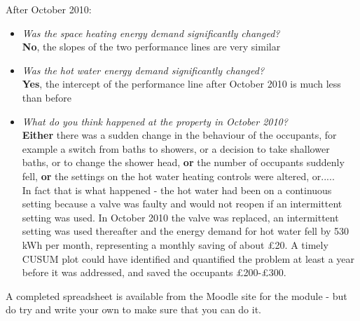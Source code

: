 \documentclass{article}
\begin{document}
\begin{enumerate}
After October 2010:
{\color{OliveGreen}
\begin{itemize}
\item \textit{Was the space heating energy demand significantly changed?} \\\textbf{No}, the slopes of the two performance lines are very similar
\item \textit{Was the hot water energy demand significantly changed?} \\ \textbf{Yes}, the intercept of the performance line after October 2010 is much less than before

\item \textit{What do you think happened at the property in October 2010?} \\ \textbf{Either} there was a sudden change in the behaviour of the occupants, for example a switch from baths to showers, or a decision to take shallower baths, or to change the shower head, \textbf{or} the number of occupants suddenly fell, \textbf{or} the settings on the hot water heating controls were altered, or..... 
\\In fact that is what happened - the hot water had been on a continuous setting because a valve was faulty and would not reopen if an intermittent setting was used. In October 2010 the valve was replaced, an intermittent setting was used thereafter and  the energy demand for hot water fell by 530 kWh per month, representing a monthly saving of about £20. A timely  CUSUM plot could have identified and quantified the problem at least a year before it was addressed, and saved the occupants £200-£300.
\end{itemize}
}

\end{enumerate}
A completed spreadsheet is available from the Moodle site for the module - but do try and write your own to make sure that you can do it.

\printbibliography
\end{document}
